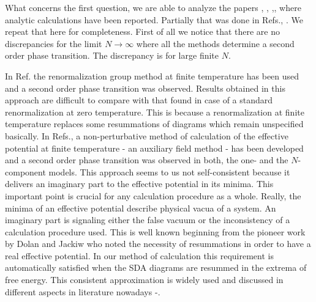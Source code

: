 \documentclass[a4paper,12pt]{article}
\begin{document}
What concerns the first question, we are able to analyze the papers
\cite{Tetradis}, \cite{Reuter} \cite{Elmfors},
\cite{Ogure1},\cite{Ogure2}, where analytic calculations have been
reported. Partially that was done in Refs.\cite{prd}, \cite{pl}. We
repeat that here for completeness.  First of all we notice that there
are no discrepancies for the limit $N \to \infty$ where all the
methods determine a second order phase transition. The discrepancy is
for large finite $N$.

In Ref.\cite{Elmfors} the renormalization group method at finite
temperature has been used and a second order phase transition was
observed. Results obtained in this approach are difficult to compare
with that found in case of a standard renormalization at zero
temperature. This is because a renormalization at finite temperature
replaces some resummations of diagrams which remain unspecified
basically. In Refs.\cite{Ogure1}, \cite{Ogure2} a non-perturbative
method of calculation of the effective potential at finite temperature
- an auxiliary field method - has been developed and a second order
phase transition was observed in both, the one- and the $N$-component
models. This approach seems to us not self-consistent because it
delivers an imaginary part to the effective potential in its
minima. This important point is crucial for any calculation procedure
as a whole. Really, the minima of an effective potential describe
physical vacua of a system. An imaginary part is signaling either the
false vacuum or the inconsistency of a calculation procedure
used. This is well known beginning from the pioneer work by Dolan and
Jackiw \cite{Dolan} who noted the necessity of resummations in order
to have a real effective potential. In our method of calculation this
requirement is automatically satisfied when the SDA diagrams are
resummed in the extrema of free energy. This consistent approximation
is widely used and discussed in different aspects in literature
nowadays \cite{Drummond1}-\cite{Peshier}.
\end{document}
